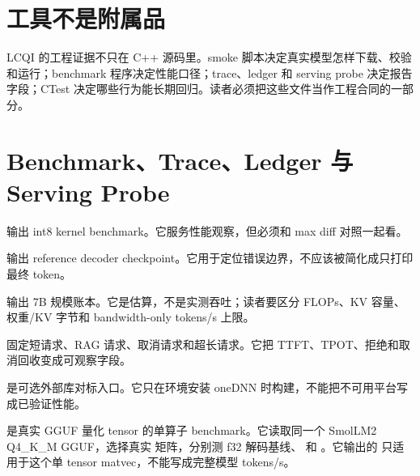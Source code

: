 \section{工具不是附属品}

LCQI 的工程证据不只在 C++ 源码里。smoke 脚本决定真实模型怎样下载、校验和运行；benchmark 程序决定性能口径；trace、ledger 和 serving probe 决定报告字段；CTest 决定哪些行为能长期回归。读者必须把这些文件当作工程合同的一部分。

\section{Benchmark、Trace、Ledger 与 Serving Probe}

 输出 int8 kernel benchmark。它服务性能观察，但必须和 max diff 对照一起看。



 输出 reference decoder checkpoint。它用于定位错误边界，不应该被简化成只打印最终 token。



 输出 7B 规模账本。它是估算，不是实测吞吐；读者要区分 FLOPs、KV 容量、权重/KV 字节和 bandwidth-only tokens/s 上限。



 固定短请求、RAG 请求、取消请求和超长请求。它把 TTFT、TPOT、拒绝和取消回收变成可观察字段。



 是可选外部库对标入口。它只在环境安装 oneDNN 时构建，不能把不可用平台写成已验证性能。



 是真实 GGUF 量化 tensor 的单算子 benchmark。它读取同一个 SmolLM2 Q4\_K\_M GGUF，选择真实  矩阵，分别测 f32 解码基线、 和 。它输出的  只适用于这个单 tensor matvec，不能写成完整模型 tokens/s。

